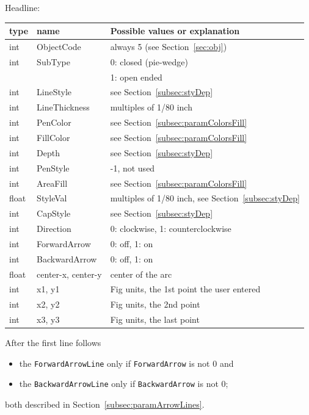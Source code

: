 \documentclass[10pt, a4paper, english]{article}%
\begin{document}
\noindent
Headline: \\
%
\begin{tabular}{lll}
\toprule
type  & name               & Possible values or explanation \\
\midrule
\midrule
int   & ObjectCode         & always 5 (see Section~\ref{sec:obj}) \\
int   & SubType            & 0: closed (pie-wedge) \\
&&                           1: open ended  \\
int   & LineStyle          & see Section~\ref{subsec:styDep} \\
int   & LineThickness      & multiples of 1/80 inch \\
int   & PenColor           & see Section~\ref{subsec:paramColorsFill} \\
int   & FillColor          & see Section~\ref{subsec:paramColorsFill} \\
int   & Depth              & see Section~\ref{subsec:styDep} \\
int   & PenStyle           & -1, not used \\
int   & AreaFill           & see Section~\ref{subsec:paramColorsFill} \\
float & StyleVal           & multiples of 1/80 inch, see Section~\ref{subsec:styDep} \\
int   & CapStyle           & see Section~\ref{subsec:styDep} \\
int   & Direction          & 0: clockwise, 1: counterclockwise \\
int   & ForwardArrow       & 0: off, 1: on \\
int   & BackwardArrow      & 0: off, 1: on \\
float & center-x, center-y & center of the arc \\
int   & x1, y1             & Fig units, the 1st point the user entered \\
int   & x2, y2             & Fig units, the 2nd point \\
int   & x3, y3             & Fig units, the last point \\
\bottomrule
\end{tabular}

\noindent
After the first line follows 
%
\begin{itemize}
\item
the \texttt{ForwardArrowLine}  only if \texttt{ForwardArrow}  is not 0 and 
\item
the \texttt{BackwardArrowLine} only if \texttt{BackwardArrow} is not 0; 
\end{itemize}
%
both described in Section~\ref{subsec:paramArrowLines}. 
\end{document}
